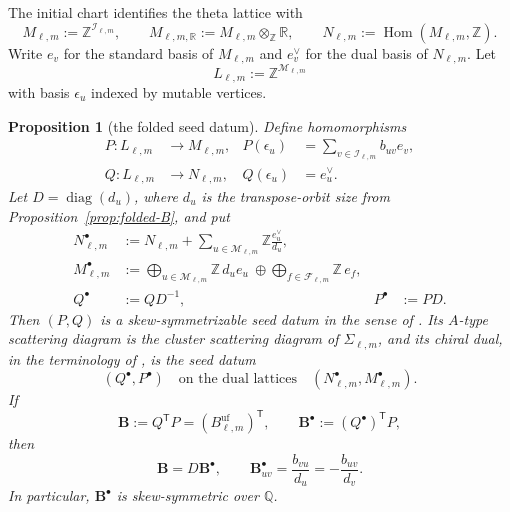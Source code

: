 \documentclass[11pt]{amsart}
\newtheorem{proposition}[theorem]{Proposition}
\theoremstyle{definition}
\theoremstyle{remark}
\begin{document}
The initial chart identifies the theta lattice with
\[ M_{\ell,m}:=\mathbb Z^{\mathscr I_{\ell,m}}, \qquad M_{\ell,m,\mathbb R}:=M_{\ell,m}\otimes_{\mathbb Z}\mathbb R, \qquad N_{\ell,m}:=\operatorname{Hom}(M_{\ell,m},\mathbb Z). \]
Write $e_v$ for the standard basis of $M_{\ell,m}$ and $e_v^\vee$ for the
dual basis of $N_{\ell,m}$.  Let
\[ L_{\ell,m}:=\mathbb Z^{\mathscr M_{\ell,m}} \]
with basis $\epsilon_u$ indexed by mutable vertices.

\begin{proposition}[the folded seed datum]
\label{prop:theta-seed-datum}
Define homomorphisms
\begin{equation*}
 \begin{aligned}
 P:L_{\ell,m}&\longrightarrow M_{\ell,m},
 &P(\epsilon_u)&=\sum_{v\in\mathscr I_{\ell,m}}b_{uv}e_v,\\
 Q:L_{\ell,m}&\longrightarrow N_{\ell,m},
 &Q(\epsilon_u)&=e_u^\vee.
 \end{aligned}
\end{equation*}
Let $D=\operatorname{diag}(d_u)$, where $d_u$ is the transpose-orbit size
from Proposition~\ref{prop:folded-B}, and put
\begin{equation}
 \begin{aligned}
 N_{\ell,m}^{\bullet}
 &:=N_{\ell,m}
   +\sum_{u\in\mathscr M_{\ell,m}}
     \mathbb Z\frac{e_u^\vee}{d_u},\\
 M_{\ell,m}^{\bullet}
 &:=\bigoplus_{u\in\mathscr M_{\ell,m}}\mathbb Z\,d_ue_u
   \ \oplus\!
   \bigoplus_{f\in\mathscr F_{\ell,m}}\mathbb Z\,e_f,\\
 Q^{\bullet}&:=QD^{-1},
 &P^{\bullet}&:=PD.
 \end{aligned}
 \label{eq:bullet-lattices-maps}
\end{equation}
Then $(P,Q)$ is a skew-symmetrizable seed datum in the sense of
\cite[Section~4.1]{CMMM}.  Its $A$-type scattering diagram is the cluster
scattering diagram of $\Sigma_{\ell,m}$, and its chiral dual, in the terminology of \cite[Section~4.5]{CMMM}, is the seed
datum
\[ (Q^{\bullet},P^{\bullet}) \quad\text{on the dual lattices}\quad (N_{\ell,m}^{\bullet},M_{\ell,m}^{\bullet}). \]
If
\[ \mathbf B:=Q^{\mathsf T}P=(B_{\ell,m}^{\mathrm{uf}})^{\mathsf T}, \qquad \mathbf B^{\bullet}:=(Q^{\bullet})^{\mathsf T}P, \]
then
\begin{equation}
 \mathbf B=D\mathbf B^{\bullet},
 \qquad
 \mathbf B^{\bullet}_{uv}=\frac{b_{vu}}{d_u}
 =-\frac{b_{uv}}{d_v}.
 \label{eq:CMMM-skew-matrix}
\end{equation}
In particular, $\mathbf B^{\bullet}$ is skew-symmetric over $\mathbb Q$.
\end{proposition}
\end{document}
